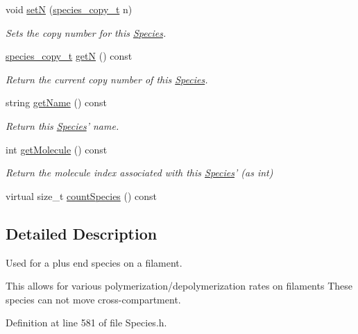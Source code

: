 \begin{DoxyCompactItemize}
void \hyperlink{classSpecies_a88de7cf5130cb9cee2da3585374db654}{set\+N} (\hyperlink{common_8h_a3503f321fd36304ee274141275cca586}{species\+\_\+copy\+\_\+t} n)
\begin{DoxyCompactList}\small\item\em Sets the copy number for this \hyperlink{classSpecies}{Species}. \end{DoxyCompactList}\item 
\hyperlink{common_8h_a3503f321fd36304ee274141275cca586}{species\+\_\+copy\+\_\+t} \hyperlink{classSpecies_aea7327b3fed261c705b4d32b9973aa58}{get\+N} () const 
\begin{DoxyCompactList}\small\item\em Return the current copy number of this \hyperlink{classSpecies}{Species}. \end{DoxyCompactList}\item 
string \hyperlink{classSpecies_a28fa239dded841133760ff9c47af63a1}{get\+Name} () const 
\begin{DoxyCompactList}\small\item\em Return this \hyperlink{classSpecies}{Species}' name. \end{DoxyCompactList}\item 
int \hyperlink{classSpecies_a1ea8969c51bc69879891a408f9e197c7}{get\+Molecule} () const 
\begin{DoxyCompactList}\small\item\em Return the molecule index associated with this \hyperlink{classSpecies}{Species}' (as int) \end{DoxyCompactList}\item 
virtual size\+\_\+t \hyperlink{classSpecies_a1864e111fe0304ca8d6b2d0d955a7356}{count\+Species} () const 
\end{DoxyCompactItemize}


\subsection{Detailed Description}
Used for a plus end species on a filament. 

This allows for various polymerization/depolymerization rates on filaments These species can not move cross-\/compartment. 

Definition at line 581 of file Species.\+h.



